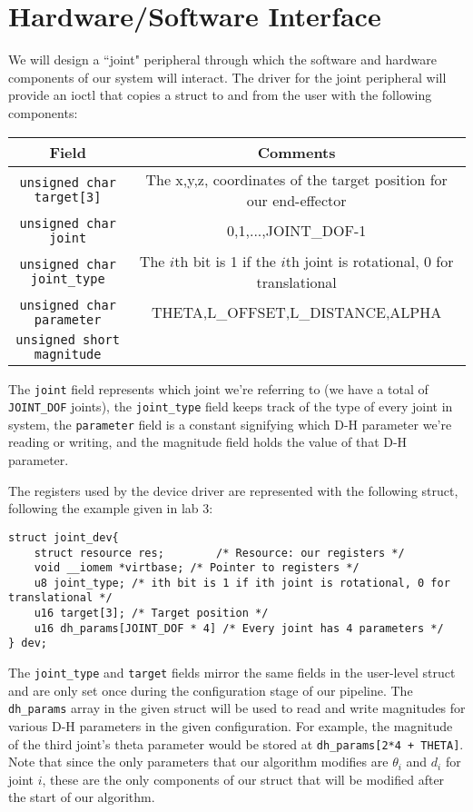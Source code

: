 \section{Hardware/Software Interface}

We will design a ``joint" peripheral through which the software and hardware components of our system will interact. 
The driver for the joint peripheral will provide an ioctl that copies a struct to and from the user with the following components:

\begin{center}
	\begin{tabular}{|c|c|}
		\hline
		Field & Comments \\
		\hline
		\texttt{unsigned char target[3]} &  The x,y,z, coordinates of the target position for our end-effector \\
			\hline
		\texttt{unsigned char joint} &  0,1,...,JOINT\_DOF-1 \\
			\hline
		\texttt{unsigned char joint\_type} & The $i$th bit is 1 if the $i$th joint is rotational, 0 for translational \\
			\hline
		\texttt{unsigned char parameter} & THETA,L\_OFFSET,L\_DISTANCE,ALPHA \\
			\hline
		\texttt{unsigned short magnitude} & ~\\
		\hline
	\end{tabular}
\end{center}
The \texttt{joint} field represents which joint we're referring to (we have a total of \texttt{JOINT\_DOF} joints), the \texttt{joint\_type}
field keeps track of the type of every joint in system, the \texttt{parameter} field
is a constant signifying which D-H parameter we're reading or writing, and the magnitude field holds the value of that D-H parameter.

The registers used by the device driver are represented with the following struct, following the example given in lab 3:

\begin{verbatim}
struct joint_dev{
	struct resource res;		/* Resource: our registers */
	void __iomem *virtbase; /* Pointer to registers */
	u8 joint_type; /* ith bit is 1 if ith joint is rotational, 0 for translational */
	u16 target[3]; /* Target position */
	u16 dh_params[JOINT_DOF * 4] /* Every joint has 4 parameters */
} dev;
\end{verbatim}

The \texttt{joint\_type} and \texttt{target} fields mirror the same fields in the user-level struct and are only set once during the configuration
stage of our pipeline. The \texttt{dh\_params} array in the given struct will be used to read and write magnitudes for various D-H parameters in the 
given configuration. For example, the magnitude of the third joint's theta parameter would be stored at \texttt{dh\_params[2*4 + THETA]}. Note that
since the only parameters that our algorithm modifies are $\theta_i$ and $d_i$ for joint $i$, these are the only components of our struct that
will be modified after the start of our algorithm.

